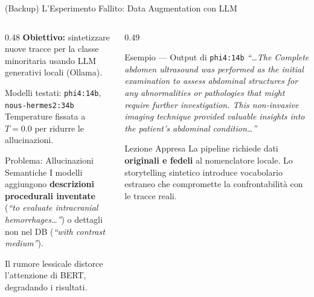\documentclass[aspectratio=169, 10pt]{beamer}
\begin{document}
\begin{frame}{(Backup) L'Esperimento Fallito: Data Augmentation con LLM}
  \begin{columns}[T]
    \begin{column}{0.48\textwidth}
      \textbf{Obiettivo:} sintetizzare nuove tracce per la classe
      minoritaria usando LLM generativi locali (Ollama).

      \vspace{0.3em}
      Modelli testati: \texttt{phi4:14b}, \texttt{nous-hermes2:34b}\\
      Temperature fissata a $T = 0.0$ per ridurre le allucinazioni.

      \vspace{0.3em}
      \begin{alertblock}{Problema: Allucinazioni Semantiche}
        I modelli aggiungono \textbf{descrizioni procedurali inventate}
        (\textit{``to evaluate intracranial hemorrhages\ldots''}) o
        dettagli non nel DB (\textit{``with contrast medium''}).

        Il rumore lessicale \alert{distorce l'attenzione} di BERT, degradando i risultati.
      \end{alertblock}
    \end{column}

    \begin{column}{0.49\textwidth}
      \begin{block}{Esempio — Output di \texttt{phi4:14b}}
        {\tiny
        \textit{``\ldots The Complete abdomen ultrasound was performed as the
        initial examination to assess abdominal structures for any
        abnormalities or pathologies that might require further
        investigation. This non-invasive imaging technique provided
        valuable insights into the patient's abdominal condition\ldots''}}
      \end{block}

      \vspace{0.3em}
      \begin{exampleblock}{Lezione Appresa}
        La pipeline richiede dati \textbf{originali e fedeli} al
        nomenclatore locale. Lo storytelling sintetico introduce
        vocabolario estraneo che compromette la
        confrontabilità con le tracce reali.
      \end{exampleblock}
    \end{column}
  \end{columns}
\end{frame}
\end{document}
